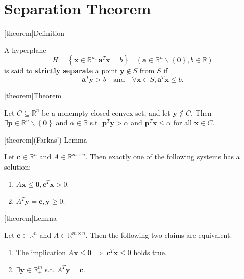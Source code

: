 \documentclass[12pt]{report}
\theoremstyle{definition}
\begin{document}
\section{Separation Theorem}

[theorem]{Definition}
\begin{separation theorem}
    A hyperplane
    \[
        H=\left\{\mathbf{x}\in\mathbb{R}^{n}:\mathbf{a}^T\mathbf{x}=b\right\}
        \quad
        (\mathbf{a}\in\mathbb{R}^{n}\backslash\left\{\mathbf{0}\right\},b\in\mathbb{R})
    \]
    is said to \textbf{strictly separate} a point $\mathbf{y}\notin S$ from $S$
    if
    \[
        \mathbf{a}^T\mathbf{y}>b
        \quad\text{and}\quad
        \forall\mathbf{x}\in S,\mathbf{a}^T\mathbf{x}\le b.
    \]
\end{separation theorem}

[theorem]{Theorem}
\begin{separation of a point from closed convex set}
    Let $C\subseteq\mathbb{R}^{n}$ be a nonempty closed convex set, and let
    $\mathbf{y}\notin C$. Then $\exists
    \mathbf{p}\in\mathbb{R}^n\backslash\left\{\mathbf{0}\right\}$ and
    $\alpha\in\mathbb{R}$ s.t. $\mathbf{p}^T\mathbf{y}>\alpha$ and
    $\mathbf{p}^T\mathbf{x}\le\alpha$ for all $\mathbf{x}\in C$.
\end{separation of a point from closed convex set}

[theorem]{(Farkas') Lemma}
\begin{farkas form 1}
    Let $\mathbf{c}\in\mathbb{R}^{n}$ and $A\in\mathbb{R}^{m\times n}$.
    Then exactly one of the following systems has a solution:
    \begin{enumerate}[label = (\roman*)]
        \item $A\mathbf{x}\le \mathbf{0}, \mathbf{c}^T\mathbf{x}>0$.
        \item $A^T\mathbf{y}=\mathbf{c},\mathbf{y}\ge 0$.
    \end{enumerate}
\end{farkas form 1}

[theorem]{Lemma}
\begin{farkas form 2}
    Let $\mathbf{c}\in\mathbb{R}^{n}$ and $A\in\mathbb{R}^{m\times n}$.
    Then the following two claims are equivalent:
    \begin{enumerate}[label = (\alph*)]
        \item The implication 
            $A\mathbf{x}\le\mathbf{0}\;\Rightarrow\;\mathbf{c}^T\mathbf{x}\le 0$
            holds true.
        \item $\exists \mathbf{y}\in\mathbb{R}_+^{m}$ s.t.
            $A^T\mathbf{y}=\mathbf{c}$.
    \end{enumerate}
\end{farkas form 2}
\end{document}
